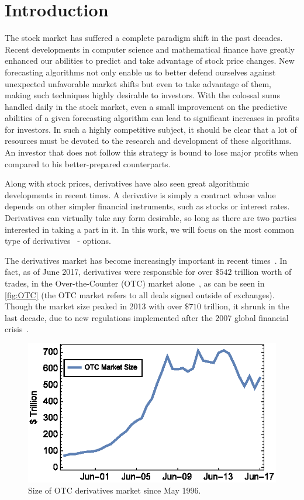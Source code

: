\documentclass[a4paper,twocolumn,aps,prd,longbibliography,superscriptaddress]{revtex4-1}
\begin{document}
\section{Introduction}
The stock market has suffered a complete paradigm shift in the past decades. Recent developments in computer science and mathematical finance have greatly enhanced our abilities to predict and take advantage of stock price changes. New forecasting algorithms not only enable us to better defend ourselves against unexpected unfavorable market shifts but even to take advantage of them, making such techniques highly desirable to investors.
With the colossal sums handled daily in the stock market, even a small improvement on the predictive abilities of a given forecasting algorithm can lead to significant increases in profits for investors. In such a highly competitive subject, it should be clear that a lot of resources must be devoted to the research and development of these algorithms. An investor that does not follow this strategy is bound to lose major profits when compared to his better-prepared counterparts.




Along with stock prices, derivatives have also seen great algorithmic developments in recent times. A derivative is simply a contract whose value depends on other simpler financial instruments, such as stocks or interest rates. Derivatives can virtually take any form desirable, so long as there are two parties interested in taking a part in it. In this work, we will focus on the most common type of derivatives~\cite{Hull} - options.

The derivatives market has become increasingly important in recent times~\cite{Hull}. In fact, as of June 2017, derivatives were responsible for over $\$542$ trillion worth of trades, in the Over-the-Counter (OTC) market alone~\cite{BIS}, as can be seen in \autoref{fig:OTC} (the OTC market refers to all deals signed outside of exchanges). Though the market size peaked in 2013 with over $\$710$ trillion, it shrunk in the last decade, due to new regulations implemented after the 2007 global financial crisis~\cite{FT}.

\begin{figure}[H]
    \centering
      \includegraphics[width=.9\columnwidth,trim={2pt 17pt 0 0},clip]{OTC.eps}
      \caption{Size of OTC derivatives market since May 1996.}\label{fig:OTC}
    \end{figure}
\end{document}
